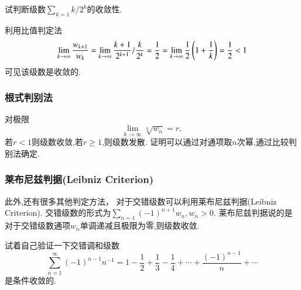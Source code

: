 \begin{example}
试判断级数$\sum_{k=1} k/2^k$的收敛性.
\end{example}
\begin{solution}
    利用比值判定法
    \[ 
        \lim_{k\to \infty} \frac{w_{k+1}}{w_k}=\lim_{k\to \infty} \frac{k+1}{2^{k+1}} / \frac{k}{2^{k}}=\frac{1}{2} 
        = \lim_{k\to \infty} \frac{1}{2}\left(1+\frac{1}{k}\right) 
        = {\frac{1}{2}} < 1
    \]
    可见该级数是收敛的.
\end{solution}

\subsubsection{根式判别法}
对极限
$$
\lim_{k\to \infty} \sqrt[n]{w_n} = r,
$$
若$r<1$则级数收敛,若$r\geq 1$,则级数发散. 证明可以通过对通项取$n$次幂,通过比较判别法确定.



\subsubsection{莱布尼兹判据(Leibniz Criterion)}
此外,还有很多其他判定方法， 对于交错级数可以利用莱布尼兹判据(Leibniz Criterion).
交错级数的形式为$\sum_{n=1} (-1)^{n+1} w_n, w_n >0$. 莱布尼兹判据说的是对于交错级数通项$w_n$单调递减且极限为零,则级数收敛.

试着自己验证一下交错调和级数
\begin{equation}
    \sum_{n=1}^{\infty}(-1)^{n-1} n^{-1}=1-\frac{1}{2}+\frac{1}{3}-\frac{1}{4}+\cdots+\frac{(-1)^{n-1}}{n}+\cdots
\end{equation}
是条件收敛的.
